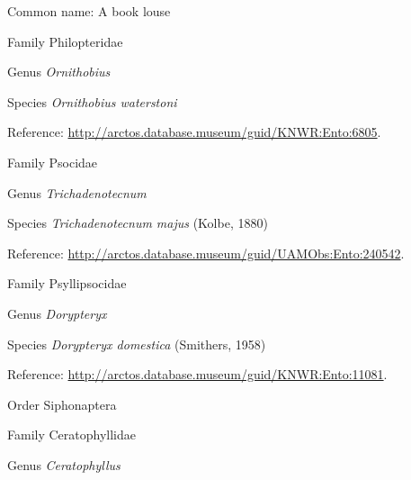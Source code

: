\documentclass[9pt, article]{memoir}
\begin{document}
\begin{multicols}{2}
Common name: A book louse

\vspace{6pt}\noindent\hspace{24pt}Family Philopteridae


\vspace{6pt}\noindent\hspace{30pt}Genus \textit{Ornithobius}


\vspace{6pt}\noindent\hspace{36pt}Species \textit{Ornithobius waterstoni}


Reference: 
\url{http://arctos.database.museum/guid/KNWR:Ento:6805}.

\vspace{6pt}\noindent\hspace{24pt}Family Psocidae


\vspace{6pt}\noindent\hspace{30pt}Genus \textit{Trichadenotecnum}


\vspace{6pt}\noindent\hspace{36pt}Species \textit{Trichadenotecnum majus} (Kolbe, 1880)


Reference: 
\url{http://arctos.database.museum/guid/UAMObs:Ento:240542}.

\vspace{6pt}\noindent\hspace{24pt}Family Psyllipsocidae


\vspace{6pt}\noindent\hspace{30pt}Genus \textit{Dorypteryx}


\vspace{6pt}\noindent\hspace{36pt}Species \textit{Dorypteryx domestica} (Smithers, 1958)


Reference: 
\url{http://arctos.database.museum/guid/KNWR:Ento:11081}.

\vspace{6pt}\noindent\hspace{18pt}Order Siphonaptera


\vspace{6pt}\noindent\hspace{24pt}Family Ceratophyllidae


\vspace{6pt}\noindent\hspace{30pt}Genus \textit{Ceratophyllus}



\end{multicols}
\end{document}
